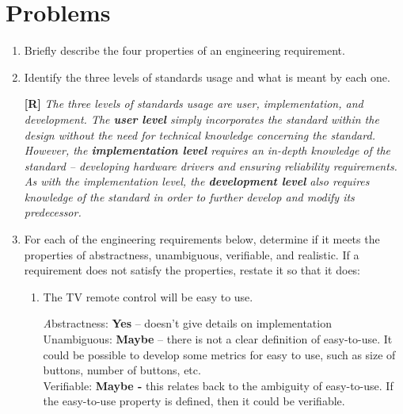 \section{Problems}
\label{section:reqSpecProblems}

\begin{enumerate}
\def\labelenumi{\arabic{enumi}.}
\item
  Briefly describe the four properties of an engineering requirement.
  
  
\item
  Identify the three levels of standards usage and what is meant by each
  one.
 \begin{onlysolution}
 \textbf{[R]}
 \itshape
  The three levels of standards usage are user, implementation, and
development. The \textbf{user level} simply incorporates the standard
within the design without the need for technical knowledge concerning
the standard. However, the \textbf{implementation level} requires an
in-depth knowledge of the standard -- developing hardware drivers and
ensuring reliability requirements. As with the implementation level, the
\textbf{development level} also requires knowledge of the standard in
order to further develop and modify its predecessor.
\end{onlysolution}
  
  
\item
  For each of the engineering requirements below, determine if it meets
  the properties of abstractness, unambiguous, verifiable, and
  realistic. If a requirement does not satisfy the properties, restate
  it so that it does:


\begin{enumerate}
\def\labelenumi{\alph{enumi})}
\item
  The TV remote control will be easy to use.
  
\begin{onlysolution}
\textit
 Abstractness: \textbf{Yes} -- doesn't give details on implementation\\
Unambiguous: \textbf{Maybe} -- there is not a clear definition of
easy-to-use. It could be possible to develop some metrics for easy to
use, such as size of buttons, number of buttons, etc.\\
Verifiable: \textbf{Maybe -} this relates back to the ambiguity of
easy-to-use. If the easy-to-use property is defined, then it could be
verifiable.
\end{onlysolution}
  

\end{enumerate}
\end{enumerate}
